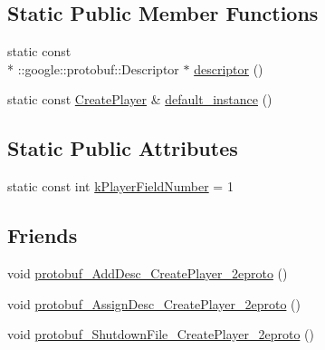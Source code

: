 \subsection*{Static Public Member Functions}
\begin{DoxyCompactItemize}
\item 
static const \\*
\-::google\-::protobuf\-::\-Descriptor $\ast$ \hyperlink{class_create_player_aa432a2da91bb59e44581d02030991ae1}{descriptor} ()
\item 
static const \hyperlink{class_create_player}{Create\-Player} \& \hyperlink{class_create_player_aeea9db2427ab00cdd0dbb69f8aa26fca}{default\-\_\-instance} ()
\end{DoxyCompactItemize}
\subsection*{Static Public Attributes}
\begin{DoxyCompactItemize}
\item 
static const int \hyperlink{class_create_player_a301c293ca078a99b8fe8aeaa5e269aa2}{k\-Player\-Field\-Number} = 1
\end{DoxyCompactItemize}
\subsection*{Friends}
\begin{DoxyCompactItemize}
\item 
void \hyperlink{class_create_player_a508cc52b267f30a83163d9b681c4cdba}{protobuf\-\_\-\-Add\-Desc\-\_\-\-Create\-Player\-\_\-2eproto} ()
\item 
void \hyperlink{class_create_player_a41a443b4974448f74d433d838b28d2db}{protobuf\-\_\-\-Assign\-Desc\-\_\-\-Create\-Player\-\_\-2eproto} ()
\item 
void \hyperlink{class_create_player_acb5335721b54abf232629cbda4a21551}{protobuf\-\_\-\-Shutdown\-File\-\_\-\-Create\-Player\-\_\-2eproto} ()
\end{DoxyCompactItemize}


